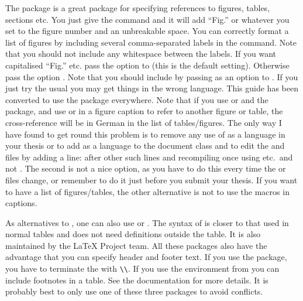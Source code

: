 The  package is a great package for specifying references to
figures, tables, sections etc.
You just give the command  and it will add \enquote{Fig.} or whatever
you set to the figure number and an unbreakable space.
You can correctly format a list of figures by including several comma-separated labels in the  command.
Note that you should not include any whitespace between the labels.
If you want capitalised \enquote{Fig.} etc. pass the option 
to  (this is the default setting).
Otherwise pass the option .
Note that you should include  by passing  
as an option to .
If you just try the usual  you may get things in the wrong language.
This guide has been converted to use the  package everywhere.
Note that if you use  or  and the  package,
and use  or  in a figure caption to refer to another figure or table,
the cross-reference will be in German in the list of tables/figures.
The only way I have found to get round this problem is to remove any use of 
as a language in your thesis or to add  as a language to the document class
and to edit the  and  files by adding a line:
 after other such lines
and recompiling once using   etc.\ and not .
The second is not a nice option, as you have to do this every time the  or  files change,
or remember to do it just before you submit your thesis.
If you want to have a list of figures/tables,
the other alternative is not to use the  macros in captions.

As alternatives to , one can also use
 or . 
The syntax of  is closer to that used in normal tables
and does not need definitions outside the table.
It is also maintained by the \LaTeX{} Project team.
All these packages also have the advantage that you
can specify header and footer text.
If you use the  package,
you have to terminate the  with \verb|\\|.
If you use the  environment from  
you can include footnotes in a table.
See the  documentation for more details.
It is probably best to only use one of these three packages to avoid conflicts.


